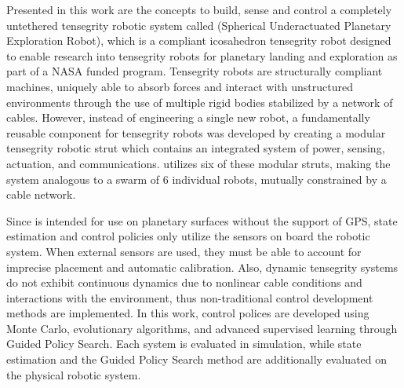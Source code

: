 Presented in this work are the concepts to build, sense and control a completely untethered tensegrity robotic system called \SB{} (Spherical Underactuated Planetary Exploration Robot), which is a compliant icosahedron tensegrity robot designed to enable research into tensegrity robots for planetary landing and exploration as part of a NASA funded program.
Tensegrity robots are structurally compliant machines, uniquely able to absorb forces and interact with unstructured environments through the use of multiple rigid bodies stabilized by a network of cables.
However, instead of engineering a single new robot, a fundamentally reusable component for tensegrity robots was developed by creating a modular tensegrity robotic strut which contains an integrated system of power, sensing, actuation, and communications.
\SB{} utilizes six of these modular struts, making the \SB{} system analogous to a swarm of 6 individual robots, mutually constrained by a cable network.

Since \SB{} is intended for use on planetary surfaces without the support of GPS, state estimation and control policies only utilize the sensors on board the robotic system.
When external sensors are used, they must be able to account for imprecise placement and automatic calibration.
Also, dynamic tensegrity systems do not exhibit continuous dynamics due to nonlinear cable conditions and interactions with the environment, thus non-traditional control development methods are implemented.
In this work, control polices are developed using Monte Carlo, evolutionary algorithms, and advanced supervised learning through Guided Policy Search.
Each system is evaluated in simulation, while state estimation and the Guided Policy Search method are additionally evaluated on the physical \SB{} robotic system.